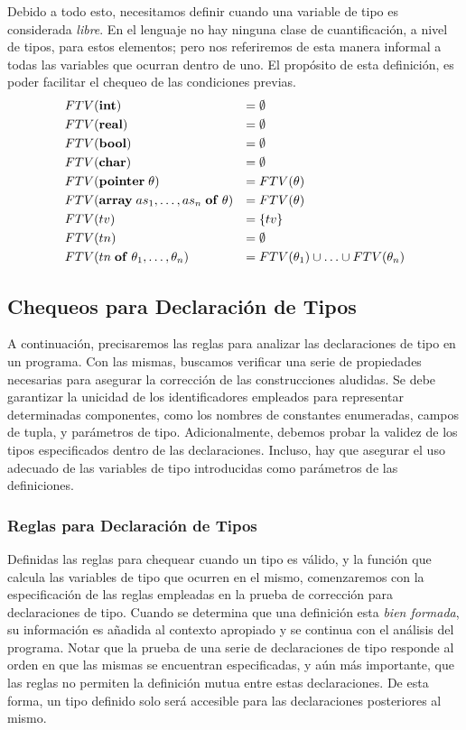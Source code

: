 Debido a todo esto, necesitamos definir cuando una variable de tipo es considerada \textit{libre}.
En el lenguaje no hay ninguna clase de cuantificación, a nivel de tipos, para estos elementos; pero nos referiremos de esta manera informal a todas las variables que ocurran dentro de uno.
El propósito de esta definición, es poder facilitar el chequeo de las condiciones previas.
\begin{align*}
&FTV(\mathbf{int})
&=&\;
\emptyset
\\
&FTV(\mathbf{real})
&=&\;
\emptyset
\\
&FTV(\mathbf{bool})
&=&\;
\emptyset
\\
&FTV(\mathbf{char})
&=&\;
\emptyset
\\
&FTV(\mathbf{pointer} \; \theta)
&=&\;
FTV(\theta)
\\
&FTV(\mathbf{array} \; as_1, \ldots, as_n \; \mathbf{of} \; \theta)
&=&\;
FTV(\theta)
\\
&FTV(tv)
&=&\;
\{ tv \}
\\
&FTV(tn)
&=&\;
\emptyset
\\
&FTV(tn \; \mathbf{of} \; \theta_1, \ldots, \theta_n)
&=&\;
FTV(\theta_1) \cup \ldots \cup FTV(\theta_n)
\end{align*}

\subsection{Chequeos para Declaración de Tipos}

A continuación, precisaremos las reglas para analizar las declaraciones de tipo en un programa.
Con las mismas, buscamos verificar una serie de propiedades necesarias para asegurar la corrección de las construcciones aludidas.
Se debe garantizar la unicidad de los identificadores empleados para representar determinadas componentes, como los nombres de constantes enumeradas, campos de tupla, y parámetros de tipo.
Adicionalmente, debemos probar la validez de los tipos especificados dentro de las declaraciones.
Incluso, hay que asegurar el uso adecuado de las variables de tipo introducidas como parámetros de las definiciones.

\subsubsection{Reglas para Declaración de Tipos}

Definidas las reglas para chequear cuando un tipo es válido, y la función que calcula las variables de tipo que ocurren en el mismo, comenzaremos con la especificación de las reglas empleadas en la prueba de corrección para declaraciones de tipo.
Cuando se determina que una definición esta \textit{bien formada}, su información es añadida al contexto apropiado y se continua con el análisis del programa.
Notar que la prueba de una serie de declaraciones de tipo responde al orden en que las mismas se encuentran especificadas, y aún más importante, que las reglas no permiten la definición mutua entre estas declaraciones.
De esta forma, un tipo definido solo será accesible para las declaraciones posteriores al mismo.

